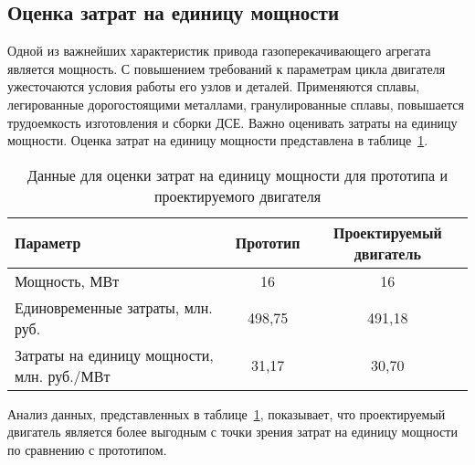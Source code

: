 \subsection{Оценка затрат на единицу мощности}
Одной из важнейших характеристик привода газоперекачивающего агрегата является мощность. С повышением требований к
параметрам цикла двигателя ужесточаются условия работы его узлов и деталей. Применяются сплавы, легированные
дорогостоящими металлами, гранулированные сплавы, повышается трудоемкость изготовления и сборки ДСЕ. Важно оценивать
затраты на единицу мощности. Оценка затрат на единицу мощности представлена в таблице~\ref{tab:economics-unit-power}.
\begin{longtable}{|p{6cm}|c|c|}
    \caption{Данные для оценки затрат на единицу мощности для прототипа и проектируемого двигателя} \label{tab:economics-unit-power}
    \hline
    \textbf{Параметр} &
    \textbf{Прототип} &
    \textbf{Проектируемый двигатель} \\\hline
    \endhead
    Мощность, МВт & 16 & 16 \\\hline
    Единовременные затраты, млн. руб. & 498,75 & 491,18 \\\hline
    Затраты на единицу мощности, млн. руб./МВт & 31,17 & 30,70 \\\hline
\end{longtable}
Анализ данных, представленных в таблице~\ref{tab:economics-unit-power}, показывает, что проектируемый двигатель является более выгодным с точки зрения
затрат на единицу мощности по сравнению с прототипом.

